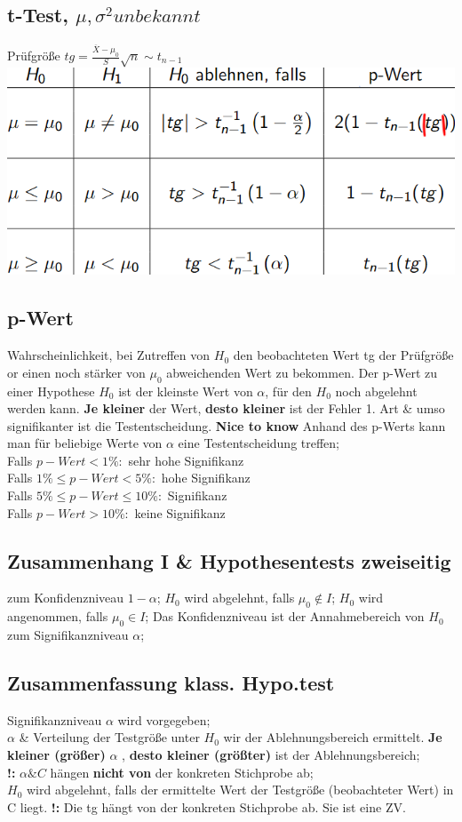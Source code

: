 \subsection{t-Test, $ \mu, \sigma^2 unbekannt  $}
Prüfgröße $ tg = \frac{ \overline{X} -\mu_{0} }{ S } \sqrt{n} \sim t_{n-1} $
\includegraphics[scale=0.25]{./pic/tTest.png}
\subsection{p-Wert}
Wahrscheinlichkeit, bei Zutreffen von $ H_{0} $ den beobachteten Wert tg der Prüfgröße or einen noch stärker von $ \mu_{0} $ abweichenden Wert zu bekommen.
Der p-Wert zu einer Hypothese $ H_{0} $ ist der kleinste Wert von $ \alpha $, für den $ H_{0} $ noch abgelehnt werden kann. \textbf{Je kleiner} der Wert, \textbf{desto kleiner} ist der Fehler 1. Art \& umso signifikanter ist die Testentscheidung. 
\textbf{Nice to know} Anhand des p-Werts kann man für beliebige Werte von $ \alpha $ eine Testentscheidung treffen;\\
Falls $ p-Wert < 1\%:$ sehr hohe Signifikanz\\
Falls $ 1\% \le p-Wert < 5\%: $ hohe Signifikanz\\
Falls $ 5\% \le p-Wert \le 10\%: $ Signifikanz\\
Falls $ p-Wert > 10\%: $ keine Signifikanz\\
\subsection{Zusammenhang I \& Hypothesentests zweiseitig}
zum Konfidenzniveau $ 1- \alpha $; 
$ H_{0} $ wird abgelehnt, falls $ \mu_{0} \notin I $; 
$ H_{0} $ wird angenommen, falls $ \mu_{0} \in I $; 
Das Konfidenzniveau ist der Annahmebereich von $ H_{0} $ zum Signifikanzniveau $ \alpha $; 
\subsection{Zusammenfassung klass. Hypo.test}
Signifikanzniveau $ \alpha $ wird vorgegeben;\\
$ \alpha $ \& Verteilung der Testgröße unter $ H_{0} $ wir der Ablehnungsbereich ermittelt. \textbf{Je kleiner (größer) } $ \alpha $ , \textbf{desto kleiner (größter) } ist der Ablehnungsbereich; \\
\textbf{!:} $ \alpha \& C $  hängen \textbf{nicht von} der konkreten Stichprobe ab;\\
$ H_{0} $ wird abgelehnt, falls der ermittelte Wert der Testgröße (beobachteter Wert) in C liegt. 
\textbf{!:} Die tg hängt von der konkreten Stichprobe ab. Sie ist eine ZV.
